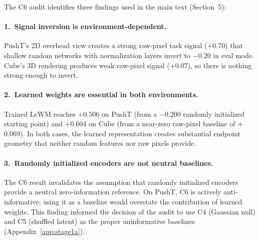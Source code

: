 The C6 audit identifies three findings used in the main text
(Section~5):

\paragraph{1.\ Signal inversion is environment-dependent.}
PushT's 2D overhead view creates a strong raw-pixel task signal ($+$0.70)
that shallow random networks with normalization layers invert to $-$0.20 in
eval mode.  Cube's 3D rendering produces weak raw-pixel signal ($+$0.07),
so there is nothing strong enough to invert.

\paragraph{2.\ Learned weights are essential in both environments.}
Trained LeWM reaches $+$0.506 on PushT (from a $-$0.200 randomly initialized
starting point) and $+$0.604 on Cube (from a near-zero raw-pixel baseline
of $+$0.069).  In both cases, the learned representation creates substantial
endpoint geometry that neither random features nor raw pixels provide.

\paragraph{3.\ Randomly initialized encoders are not neutral baselines.}
The C6 result invalidates the assumption that randomly initialized encoders provide
a neutral zero-information reference.  On PushT, C6 is actively
anti-informative; using it as a baseline would overstate the contribution of
learned weights.  This finding informed the decision of the audit to use C4
(Gaussian null) and C5 (shuffled latent) as the proper uninformative
baselines (Appendix~\ref{app:stage1a}).

